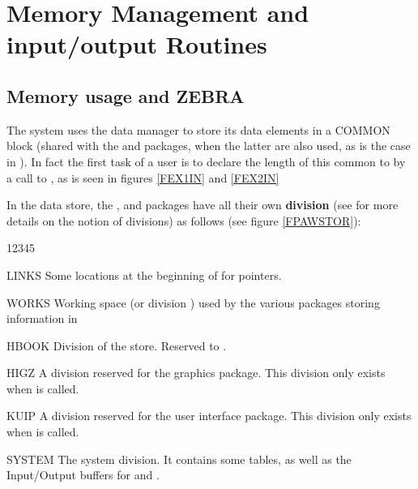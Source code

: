  
\chapter{Memory Management and input/output Routines}
\label{HMEMORYM}
 
\section{Memory usage and ZEBRA}
\label{HMEMOUSE}

The \HBOOK{} system uses the \ZEBRA{} data manager
to store its data elements in a COMMON block  
(shared with the \KUIP{} and \HIGZ{} packages, when the latter are
also used, as is the case in \PAW{}). In fact the first task of a
\HBOOK{} user is to declare the length of this common to
\ZEBRA{} by a call to , as is seen in
figures \ref{FEX1IN} and \ref{FEX2IN}
      
In the  data store, the \HBOOK,
\HIGZ{} and \KUIP{} packages have all their own
{\bf division} (see \cite{bib-ZEBRA} for
more details on the notion of divisions) as follows (see figure \ref{FPAWSTOR}):
 
\begin{DLtt}{12345}
\item[LINKS] Some locations at the beginning of
      for \ZEBRA{} pointers.
\item[WORKS]  Working space (or division ) used by the
      various packages storing information in 
\item[HBOOK] Division  of the store. Reserved to \HBOOK.
\item[HIGZ] A division reserved for the \HIGZ{} graphics package.
      This division only exists when \HIGZ{} is called.
\item[KUIP] A division reserved for the \KUIP{} user interface package.
      This division only exists when \KUIP{} is called.
\item[SYSTEM] The \ZEBRA{} system division.
      It contains some tables, as well as
      the Input/Output buffers for  and .
\end{DLtt}


